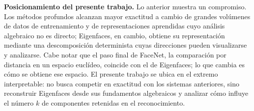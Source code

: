 \textbf{Posicionamiento del presente trabajo.} Lo anterior muestra un compromiso.
Los métodos profundos alcanzan mayor exactitud a cambio de grandes volúmenes de datos
de entrenamiento y de representaciones aprendidas cuyo análisis algebraico no es
directo; Eigenfaces, en cambio, obtiene su representación mediante una descomposición
determinista cuyas direcciones pueden visualizarse y analizarse. Cabe notar que el
paso final de FaceNet, la comparación por distancia en un espacio euclídeo, coincide
con el de Eigenfaces; lo que cambia es cómo se obtiene ese espacio. El presente trabajo
se ubica en el extremo interpretable: no busca competir en exactitud con los sistemas
anteriores, sino reconstruir Eigenfaces desde sus fundamentos algebraicos y analizar
cómo influye el número $k$ de componentes retenidas en el reconocimiento.